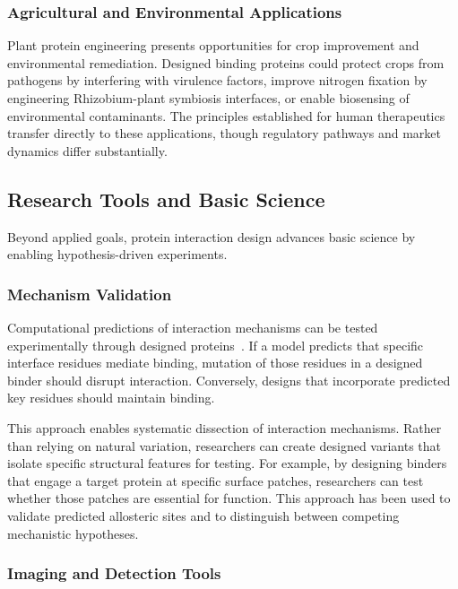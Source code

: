 \subsubsection{Agricultural and Environmental Applications}

Plant protein engineering presents opportunities for crop improvement and environmental remediation. Designed binding proteins could protect crops from pathogens by interfering with virulence factors, improve nitrogen fixation by engineering Rhizobium-plant symbiosis interfaces, or enable biosensing of environmental contaminants. The principles established for human therapeutics transfer directly to these applications, though regulatory pathways and market dynamics differ substantially.

\subsection{Research Tools and Basic Science}
\label{subsec:research}

Beyond applied goals, protein interaction design advances basic science by enabling hypothesis-driven experiments.

\subsubsection{Mechanism Validation}

Computational predictions of interaction mechanisms can be tested experimentally through designed proteins~\cite{watson2023rfdiffusion}. If a model predicts that specific interface residues mediate binding, mutation of those residues in a designed binder should disrupt interaction. Conversely, designs that incorporate predicted key residues should maintain binding.

This approach enables systematic dissection of interaction mechanisms. Rather than relying on natural variation, researchers can create designed variants that isolate specific structural features for testing. For example, by designing binders that engage a target protein at specific surface patches, researchers can test whether those patches are essential for function. This approach has been used to validate predicted allosteric sites and to distinguish between competing mechanistic hypotheses.

\subsubsection{Imaging and Detection Tools}

